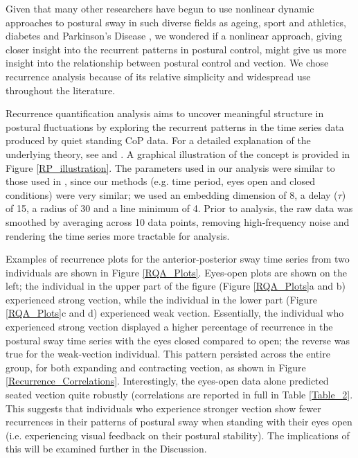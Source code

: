 \documentclass[11pt]{article}
\begin{document}
\begin{linenumbers}
Given that many other researchers have begun to use nonlinear dynamic approaches to postural sway in such diverse fields as ageing, sport and athletics, diabetes and Parkinson's Disease \cite{Donner:2010je, Marwan:2011tf, Ramdani:2013da, Riley:2003vh, Schmit:2006bc, Schmit:2005cw}, we wondered if a nonlinear approach, giving closer insight into the recurrent patterns in postural control, might give us more insight into the relationship between postural control and vection. We chose recurrence analysis because of its relative simplicity and widespread use throughout the literature. %

Recurrence quantification analysis aims to uncover meaningful structure in postural fluctuations by exploring the recurrent patterns in the time series data produced by quiet standing CoP data. For a detailed explanation of the underlying theory, see \cite{Riley:1999ug} and \cite{Hasson:2008ww}. A graphical illustration of the concept is provided in Figure \ref{RP_illustration}. The parameters used in our analysis were similar to those used in \cite{Riley:1999ug}, since our methods (e.g. time period, eyes open and closed conditions) were very similar; we used an embedding dimension of 8, a delay ($\tau$) of 15, a radius of 30 and a line minimum of 4. Prior to analysis, the raw data was smoothed by averaging across 10 data points, removing high-frequency noise and rendering the time series more tractable for analysis. 

Examples of recurrence plots for the anterior-posterior sway time series from two individuals are shown in Figure \ref{RQA_Plots}. Eyes-open plots are shown on the left; the individual in the upper part of the figure (Figure \ref{RQA_Plots}a and b) experienced strong vection, while the individual in the lower part (Figure \ref{RQA_Plots}c and d) experienced weak vection. Essentially, the individual who experienced strong vection displayed a higher percentage of recurrence in the postural sway time series with the eyes closed compared to open; the reverse was true for the weak-vection individual. This pattern persisted across the entire group, for both expanding and contracting vection, as shown in Figure \ref{Recurrence_Correlations}. Interestingly, the eyes-open data alone predicted seated vection quite robustly (correlations are reported in full in Table \ref{Table_2}. This suggests that  individuals who experience stronger vection show fewer recurrences in their patterns of postural sway when standing with their eyes open (i.e. experiencing visual feedback on their postural stability). The implications of this will be examined further in the Discussion.


\end{linenumbers}
\end{document}
